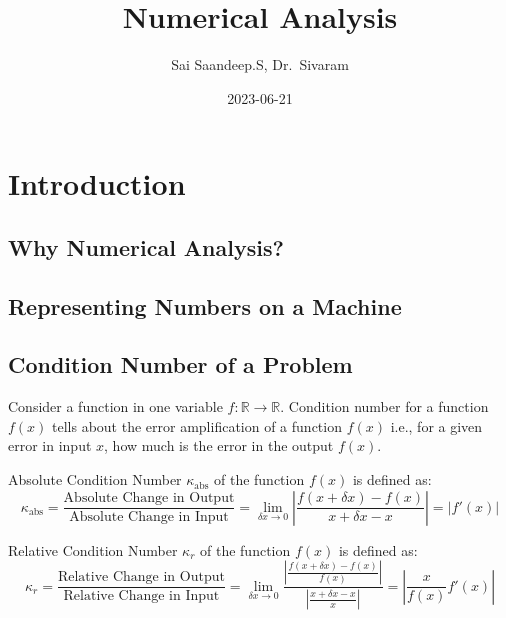 \documentclass[
]{book}
\title{Numerical Analysis}
\author{Sai Saandeep.S, Dr.~Sivaram}
\date{2023-06-21}
\begin{document}
\maketitle

{
\setcounter{tocdepth}{1}
\tableofcontents
}
\hypertarget{introduction}{%
\chapter{Introduction}\label{introduction}}

\hypertarget{why-numerical-analysis}{%
\section{Why Numerical Analysis?}\label{why-numerical-analysis}}

\hypertarget{representing-numbers-on-a-machine}{%
\section{Representing Numbers on a Machine}\label{representing-numbers-on-a-machine}}

\hypertarget{condition-number-of-a-problem}{%
\section{Condition Number of a Problem}\label{condition-number-of-a-problem}}

Consider a function in one variable \(f:\mathbb{R}\to\mathbb{R}\).
Condition number for a function \(f(x)\) tells about the error amplification of a function \(f(x)\) i.e., for a given error in input \(x\), how much is the error in the output \(f(x)\).

Absolute Condition Number \(\kappa_{\text{abs}}\) of the function \(f(x)\) is defined as:
\begin{equation}
\kappa_{\text{abs}} = \frac{\text{Absolute Change in Output}}{\text{Absolute Change in Input}} = \lim_{\delta x \to 0} \left\lvert{\frac{f(x+\delta x)-f(x)}{x+\delta x - x}}\right\rvert = \left\lvert{f'(x)}\right\rvert
\end{equation}

Relative Condition Number \(\kappa_{r}\) of the function \(f(x)\) is defined as:
\begin{equation}
\kappa_{r} = \frac{\text{Relative Change in Output}}{\text{Relative Change in Input}} = \lim_{\delta x \to 0} \frac{\left\lvert{\frac{f(x+\delta x)-f(x)}{f(x)}}\right\rvert}{\left\lvert{\frac{x+\delta x - x}{x}}\right\rvert} = \left\lvert{\frac{x}{f(x)}f'(x)}\right\rvert
\end{equation}
\end{document}
